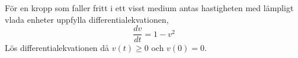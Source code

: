 \documentclass[11pt]{article}
\begin{document}
För en kropp som faller fritt i ett visst medium antas hastigheten med lämpligt vlada enheter uppfylla differentialekvationen,
\[
    \frac{dv}{dt} = 1 - v^2
\]
Lös differentialekvationen då $v(t) \geq 0$ och $v(0) = 0$.
\end{document}
